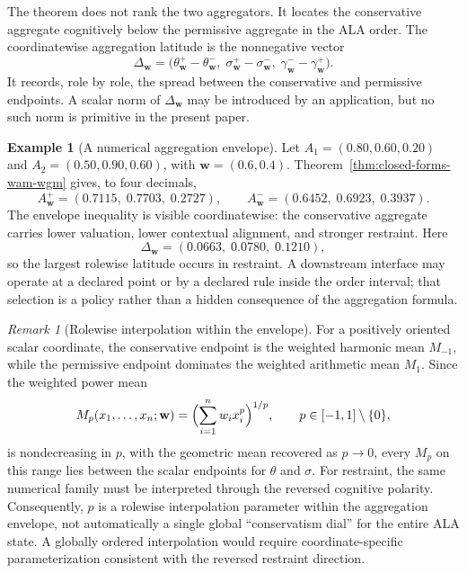 \documentclass[reqno,final]{amsart}
\theoremstyle{definition}
\newtheorem{example}{Example}
\theoremstyle{plain}
\theoremstyle{remark}
\newtheorem{remark}{Remark}
\begin{document}
The theorem does not rank the two aggregators. It locates the conservative aggregate cognitively below the permissive aggregate in the ALA order. The coordinatewise aggregation latitude is the nonnegative vector
\[
\Delta_{\mathbf w}
=
\bigl(
\theta_{\mathbf w}^{+}-\theta_{\mathbf w}^{-},
\;
\sigma_{\mathbf w}^{+}-\sigma_{\mathbf w}^{-},
\;
\gamma_{\mathbf w}^{-}-\gamma_{\mathbf w}^{+}
\bigr).
\]
It records, role by role, the spread between the conservative and permissive endpoints. A scalar norm of \(\Delta_{\mathbf w}\) may be introduced by an application, but no such norm is primitive in the present paper.

\begin{example}[A numerical aggregation envelope]
\label{ex:aggregation-envelope}
Let \(A_1=(0.80,0.60,0.20)\) and \(A_2=(0.50,0.90,0.60)\), with \(\mathbf{w}=(0.6,0.4)\). Theorem~\ref{thm:closed-forms-wam-wgm} gives, to four decimals,
\[
A^{+}_{\mathbf{w}}=(0.7115,\;0.7703,\;0.2727),
\qquad
A^{-}_{\mathbf{w}}=(0.6452,\;0.6923,\;0.3937).
\]
The envelope inequality is visible coordinatewise: the conservative aggregate carries lower valuation, lower contextual alignment, and stronger restraint. Here
\[
\Delta_{\mathbf w}
=
(0.0663,\;0.0780,\;0.1210),
\]
so the largest rolewise latitude occurs in restraint. A downstream interface may operate at a declared point or by a declared rule inside the order interval; that selection is a policy rather than a hidden consequence of the aggregation formula.
\end{example}

\begin{remark}[Rolewise interpolation within the envelope]
\label{rem:power-mean}
For a positively oriented scalar coordinate, the conservative endpoint is the weighted harmonic mean \(M_{-1}\), while the permissive endpoint dominates the weighted arithmetic mean \(M_1\). Since the weighted power mean
\[
M_p(x_1,\ldots,x_n;\mathbf{w})
=
\Bigl(\sum_{i=1}^{n}w_i x_i^{p}\Bigr)^{1/p},
\qquad
p\in[-1,1]\setminus\{0\},
\]
is nondecreasing in \(p\), with the geometric mean recovered as \(p\to0\), every \(M_p\) on this range lies between the scalar endpoints for \(\theta\) and \(\sigma\). For restraint, the same numerical family must be interpreted through the reversed cognitive polarity. Consequently, \(p\) is a rolewise interpolation parameter within the aggregation envelope, not automatically a single global ``conservatism dial'' for the entire ALA state. A globally ordered interpolation would require coordinate-specific parameterization consistent with the reversed restraint direction.
\end{remark}
\end{document}
